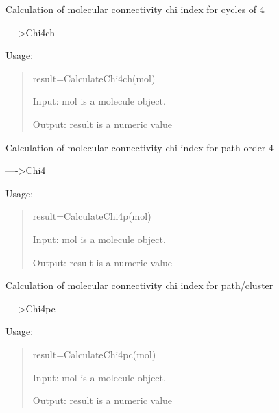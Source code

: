 \documentclass[letterpaper,10pt,english]{sphinxmanual}
\begin{document}

\begin{fulllineitems}
\label{reference/connectivity:connectivity.CalculateChi4ch}
Calculation of molecular connectivity chi index for cycles of 4

----\textgreater{}Chi4ch

Usage:
\begin{quote}

result=CalculateChi4ch(mol)

Input: mol is a molecule object.

Output: result is a numeric value
\end{quote}

\end{fulllineitems}


\begin{fulllineitems}
\label{reference/connectivity:connectivity.CalculateChi4p}
Calculation of molecular connectivity chi index for path order 4

----\textgreater{}Chi4

Usage:
\begin{quote}

result=CalculateChi4p(mol)

Input: mol is a molecule object.

Output: result is a numeric value
\end{quote}

\end{fulllineitems}


\begin{fulllineitems}
\label{reference/connectivity:connectivity.CalculateChi4pc}
Calculation of molecular connectivity chi index for path/cluster

----\textgreater{}Chi4pc

Usage:
\begin{quote}

result=CalculateChi4pc(mol)

Input: mol is a molecule object.

Output: result is a numeric value
\end{quote}

\end{fulllineitems}
\end{document}
